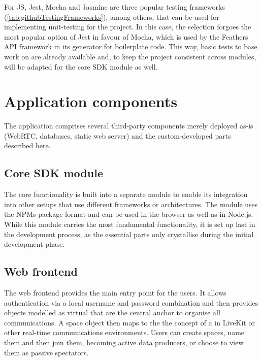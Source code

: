 For \ac{JS}, Jest, Mocha and Jasmine are three popular testing frameworks (\ref{tab:githubTestingFrameworks}), among others, that can be used for implementing unit-testing for the project.
In this case, the selection forgoes the most popular option of Jest in favour of Mocha, which is used by the Feathers \ac{API} framework in its generator for boilerplate code.
This way, basic tests to base work on are already available and, to keep the project consistent across modules, will be adapted for the core \ac{SDK} module as well.



\section{Application components}
\label{sec:application-components}

The application comprises several third-party components merely deployed as-is (WebRTC, databases, static web server) and the custom-developed parts described here.

\subsection{Core SDK module}

The core functionality is built into a separate module to enable its integration into other setups that use different frameworks or architectures.
The module uses the \ac{NPM}\textquotesingle s package format and can be used in the browser as well as in Node.js.
While this module carries the most fundamental functionality, it is set up last in the development process, as the essential parts only crystallise during the initial development phase.

\subsection{Web frontend}

The web frontend provides the main entry point for the users.
It allows authentication via a local username and password combination and then provides objects modelled as virtual  that are the central anchor to organise all communications.
A space object then maps to the the concept of a  in LiveKit or other real-time communications environments.
Users can create spaces, name them and then join them, becoming active data producers, or choose to view them as passive spectators.

